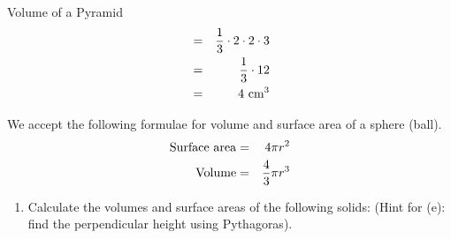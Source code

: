 \begin{wex}{Volume of a Pyramid}
{
\begin{eqnarray*}
&=&\frac{1}{3}\cdot 2 \cdot 2 \cdot 3\\
&=&\frac{1}{3} \cdot 12\\
&=&4\textnormal{ cm}^3
\end{eqnarray*}
}
\end{wex}


We accept the following formulae for volume and surface area of a sphere (ball).
\begin{eqnarray*}
\textnormal{Surface area} &=& 4 \pi r^2\\
\textnormal{Volume} &=& \frac{4}{3} \pi r^3\\
\end{eqnarray*}

{
\begin{enumerate}

\item Calculate the volumes and surface areas of the following solids: (Hint for (e): find the perpendicular height using Pythagoras). 


\end{enumerate}}

